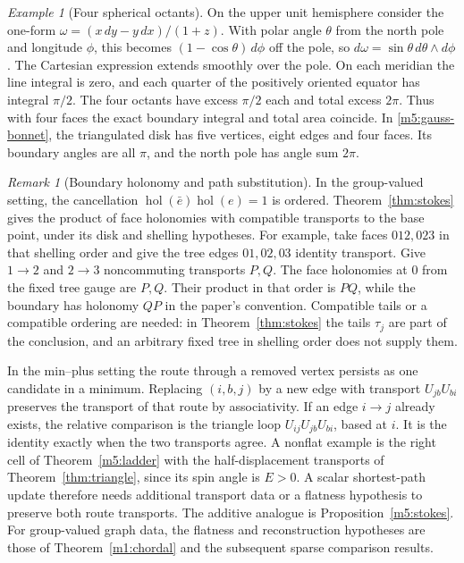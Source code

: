 \documentclass[11pt,reqno]{amsart}
\theoremstyle{definition}
\theoremstyle{remark}
\newtheorem{remark}[theorem]{Remark}
\newtheorem{example}[theorem]{Example}
\numberwithin{equation}{section}
\newcommand{\hol}{\operatorname{hol}}
\begin{document}
\begin{example}[Four spherical octants]\label{m5:hemisphere}
On the upper unit hemisphere consider the one-form
\(\omega=(x\,dy-y\,dx)/(1+z)\). With polar angle \(\theta\) from the
north pole and longitude \(\phi\), this becomes
\((1-\cos\theta)\,d\phi\) off the pole, so \(d\omega=\sin\theta\,
d\theta\wedge d\phi\). The Cartesian expression extends smoothly over
the pole. On each meridian the line integral is zero, and each quarter
of the positively oriented equator has integral \(\pi/2\).
The four octants have excess \(\pi/2\) each and total excess \(2\pi\).
Thus with four faces the exact boundary integral and total area coincide.
In \eqref{m5:gauss-bonnet}, the triangulated disk has five vertices,
eight edges and four faces. Its boundary angles are all \(\pi\), and
the north pole has angle sum \(2\pi\).
\end{example}

\begin{remark}[Boundary holonomy and path substitution]\label{m5:holonomy}
In the group-valued setting, the cancellation \(\hol(\bar e)\hol(e)=1\)
is ordered. Theorem~\ref{thm:stokes} gives the product of face holonomies
with compatible transports to the base point, under its disk and
shelling hypotheses. For example, take faces \(012,023\) in that
shelling order and give the tree edges \(01,02,03\) identity transport.
Give \(1\to2\) and \(2\to3\) noncommuting transports \(P,Q\).
The face holonomies at \(0\) from the fixed tree gauge are \(P,Q\).
Their product in that order is \(PQ\), while the boundary has holonomy
\(QP\) in the paper's convention. Compatible tails or a compatible
ordering are needed: in Theorem~\ref{thm:stokes} the tails \(\tau_j\) are part of the conclusion, and an arbitrary fixed tree in
shelling order does not supply them.

In the min--plus setting the route through a removed vertex persists
as one candidate in a minimum. Replacing \((i,b,j)\) by a new edge
with transport \(U_{jb}U_{bi}\) preserves the transport of that route
by associativity. If an edge \(i\to j\) already exists, the relative
comparison is the triangle loop \(U_{ij}U_{jb}U_{bi}\), based at \(i\).
It is the identity exactly when the two transports agree. A nonflat
example is the right cell of Theorem~\ref{m5:ladder} with the
half-displacement transports of Theorem~\ref{thm:triangle}, since its
spin angle is \(E>0\). A scalar shortest-path update therefore needs
additional transport data or a flatness hypothesis to preserve both
route transports. The additive analogue is Proposition~\ref{m5:stokes}.
For group-valued graph data, the flatness and reconstruction hypotheses
are those of Theorem~\ref{m1:chordal} and the subsequent sparse
comparison results.
\end{remark}
\end{document}
